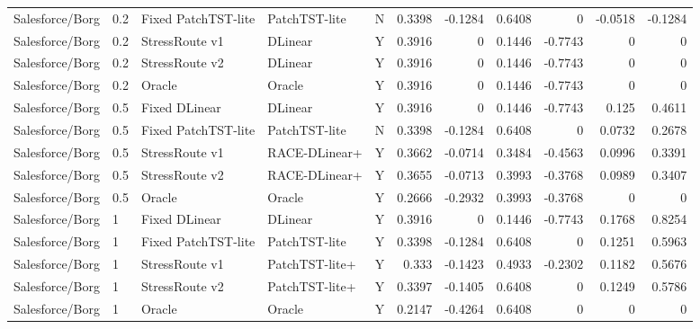 \begin{table}[t]
{\begin{tabular}{lllllrrrrrr}
Salesforce/Borg & 0.2 & Fixed PatchTST-lite & PatchTST-lite & N & 0.3398 & -0.1284 & 0.6408 & 0 & -0.0518 & -0.1284 \\
Salesforce/Borg & 0.2 & StressRoute v1 & DLinear & Y & 0.3916 & 0 & 0.1446 & -0.7743 & 0 & 0 \\
Salesforce/Borg & 0.2 & StressRoute v2 & DLinear & Y & 0.3916 & 0 & 0.1446 & -0.7743 & 0 & 0 \\
Salesforce/Borg & 0.2 & Oracle & Oracle & Y & 0.3916 & 0 & 0.1446 & -0.7743 & 0 & 0 \\
Salesforce/Borg & 0.5 & Fixed DLinear & DLinear & Y & 0.3916 & 0 & 0.1446 & -0.7743 & 0.125 & 0.4611 \\
Salesforce/Borg & 0.5 & Fixed PatchTST-lite & PatchTST-lite & N & 0.3398 & -0.1284 & 0.6408 & 0 & 0.0732 & 0.2678 \\
Salesforce/Borg & 0.5 & StressRoute v1 & RACE-DLinear+ & Y & 0.3662 & -0.0714 & 0.3484 & -0.4563 & 0.0996 & 0.3391 \\
Salesforce/Borg & 0.5 & StressRoute v2 & RACE-DLinear+ & Y & 0.3655 & -0.0713 & 0.3993 & -0.3768 & 0.0989 & 0.3407 \\
Salesforce/Borg & 0.5 & Oracle & Oracle & Y & 0.2666 & -0.2932 & 0.3993 & -0.3768 & 0 & 0 \\
Salesforce/Borg & 1 & Fixed DLinear & DLinear & Y & 0.3916 & 0 & 0.1446 & -0.7743 & 0.1768 & 0.8254 \\
Salesforce/Borg & 1 & Fixed PatchTST-lite & PatchTST-lite & Y & 0.3398 & -0.1284 & 0.6408 & 0 & 0.1251 & 0.5963 \\
Salesforce/Borg & 1 & StressRoute v1 & PatchTST-lite+ & Y & 0.333 & -0.1423 & 0.4933 & -0.2302 & 0.1182 & 0.5676 \\
Salesforce/Borg & 1 & StressRoute v2 & PatchTST-lite+ & Y & 0.3397 & -0.1405 & 0.6408 & 0 & 0.1249 & 0.5786 \\
Salesforce/Borg & 1 & Oracle & Oracle & Y & 0.2147 & -0.4264 & 0.6408 & 0 & 0 & 0 \\
\bottomrule
\end{tabular}
}
\end{table}
